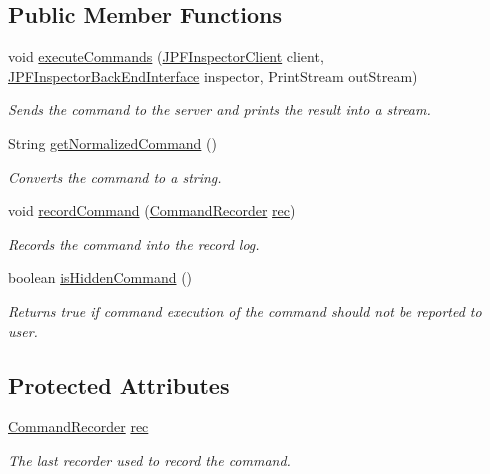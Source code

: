 \subsection*{Public Member Functions}
\begin{DoxyCompactItemize}
\item 
void \hyperlink{classgov_1_1nasa_1_1jpf_1_1inspector_1_1client_1_1commands_1_1_cmd_help_af5565ada6073f40b9645c510a34d0b8d}{execute\+Commands} (\hyperlink{classgov_1_1nasa_1_1jpf_1_1inspector_1_1client_1_1_j_p_f_inspector_client}{J\+P\+F\+Inspector\+Client} client, \hyperlink{interfacegov_1_1nasa_1_1jpf_1_1inspector_1_1interfaces_1_1_j_p_f_inspector_back_end_interface}{J\+P\+F\+Inspector\+Back\+End\+Interface} inspector, Print\+Stream out\+Stream)
\begin{DoxyCompactList}\small\item\em Sends the command to the server and prints the result into a stream. \end{DoxyCompactList}\item 
String \hyperlink{classgov_1_1nasa_1_1jpf_1_1inspector_1_1client_1_1commands_1_1_cmd_help_abe9862e6905dbf03c6aa9468ac112520}{get\+Normalized\+Command} ()
\begin{DoxyCompactList}\small\item\em Converts the command to a string. \end{DoxyCompactList}\item 
void \hyperlink{classgov_1_1nasa_1_1jpf_1_1inspector_1_1client_1_1_client_command_ae0670332ec750bc5b9016d0b04d8adfe}{record\+Command} (\hyperlink{classgov_1_1nasa_1_1jpf_1_1inspector_1_1client_1_1_command_recorder}{Command\+Recorder} \hyperlink{classgov_1_1nasa_1_1jpf_1_1inspector_1_1client_1_1_client_command_af4246f2427035c72a6af45a2c61361f7}{rec})
\begin{DoxyCompactList}\small\item\em Records the command into the record log. \end{DoxyCompactList}\item 
boolean \hyperlink{classgov_1_1nasa_1_1jpf_1_1inspector_1_1client_1_1_client_command_afb09c400c64e2d8e01059b91ff847761}{is\+Hidden\+Command} ()
\begin{DoxyCompactList}\small\item\em Returns true if command execution of the command should not be reported to user. \end{DoxyCompactList}\end{DoxyCompactItemize}
\subsection*{Protected Attributes}
\begin{DoxyCompactItemize}
\item 
\hyperlink{classgov_1_1nasa_1_1jpf_1_1inspector_1_1client_1_1_command_recorder}{Command\+Recorder} \hyperlink{classgov_1_1nasa_1_1jpf_1_1inspector_1_1client_1_1_client_command_af4246f2427035c72a6af45a2c61361f7}{rec}
\begin{DoxyCompactList}\small\item\em The last recorder used to record the command. \end{DoxyCompactList}\end{DoxyCompactItemize}
